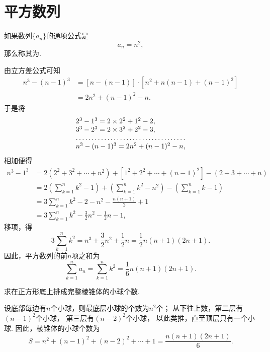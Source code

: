 \section{平方数列}
如果数列\(\{a_n\}\)的通项公式是\begin{equation*}
a_n = n^2,
\end{equation*}那么称其为.

由立方差公式可知
\begin{equation*}\begin{aligned}
n^3 - (n-1)^3
&= [n - (n-1)] \cdot [n^2 + n(n-1) + (n-1)^2] \\
&= 2n^2 + (n-1)^2 - n.
\end{aligned}\end{equation*}于是将\begin{equation*}
\begin{array}{l}
2^3 - 1^3 = 2\times2^2+1^2-2, \\
3^3 - 2^3 = 2\times3^2+2^2-3, \\
\hdotsfor{1} \\
n^3 - (n-1)^3 = 2n^2 + (n-1)^2 - n,
\end{array}
\end{equation*}相加便得\begin{equation*}\begin{aligned}
n^3 - 1^3
&= 2(2^2+3^2+\dotsb+n^2) + [1^2+2^2+\dotsb+(n-1)^2] - (2+3+\dotsb+n) \\
&= 2\left(\sum_{k=1}^n k^2 - 1\right)
    + \left(\sum_{k=1}^n k^2 - n^2\right)
    - \left(\sum_{k=1}^n k - 1\right) \\
&= 3\sum_{k=1}^n k^2 - 2 - n^2 - \frac{n(n+1)}{2} + 1 \\
&= 3\sum_{k=1}^n k^2 - \frac{3}{2} n^2 - \frac{1}{2} n - 1,
\end{aligned}\end{equation*}
移项，得\begin{equation*}
3 \sum_{k=1}^n k^2
= n^3 + \frac{3}{2} n^2 + \frac{1}{2} n
= \frac{1}{2} n (n+1) (2n+1).
\end{equation*}
因此，平方数列的前\(n\)项之和为
\begin{equation}
	\sum_{k=1}^n a_n
	= \sum_{k=1}^n k^2
	= \frac{1}{6} n(n+1)(2n+1).
\end{equation}

\begin{example}
求在正方形底上排成完整棱锥体的小球个数.
\begin{solution}
设底部每边有\(n\)个小球，则最底层小球的个数为\(n^2\)个；
从下往上数，第二层有\((n-1)^2\)个小球，
第三层有\((n-2)^2\)个小球，
以此类推，直至顶层只有一个小球.
因此，棱锥体的小球个数为\begin{equation*}
    S = n^2+(n-1)^2+(n-2)^2+\dotsb+1
    = \frac{n(n+1)(2n+1)}{6}.
\end{equation*}
\end{solution}
\end{example}

